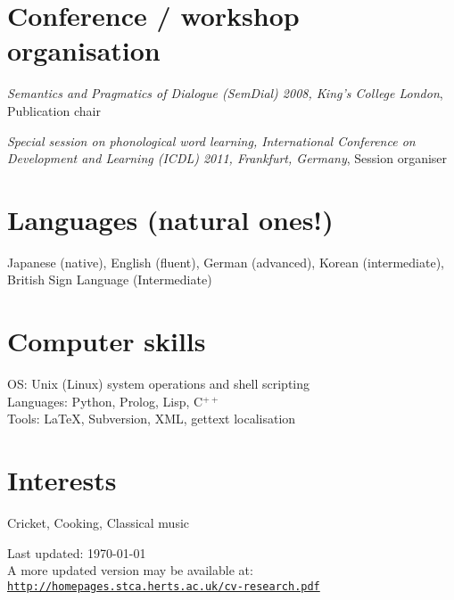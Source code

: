 \documentclass[a4paper]{article}
\def\footerlink{http://homepages.stca.herts.ac.uk/cv-research.pdf}
\renewenvironment{itemize}{
  \begin{list}{}{
    \setlength{\leftmargin}{1.5em}
  }
}{
  \end{list}
}
\begin{document}
\section*{Conference / workshop organisation}
\begin{itemize}
\item {\em Semantics and Pragmatics of Dialogue (SemDial) 2008, King's College London}, Publication chair
\item  {\em Special session on phonological word learning, International
    Conference on Development and Learning (ICDL) 2011, Frankfurt,
    Germany}, Session organiser

\end{itemize}


\section*{Languages (natural ones!)}

Japanese (native), English (fluent), German (advanced), Korean (intermediate), British Sign Language (Intermediate)

\section*{Computer skills}

OS: Unix (Linux) system operations and shell scripting\\
Languages: Python, Prolog, Lisp, C$^{++}$\\
Tools: \LaTeX, Subversion, XML, gettext localisation




\section*{Interests}
Cricket, Cooking, Classical music


\begin{center}
  \begin{footnotesize}
    Last updated: \today\\A more updated version may be available at: \\
    \href{\footerlink}{\texttt{\footerlink}}
  \end{footnotesize}
\end{center}
\end{document}
